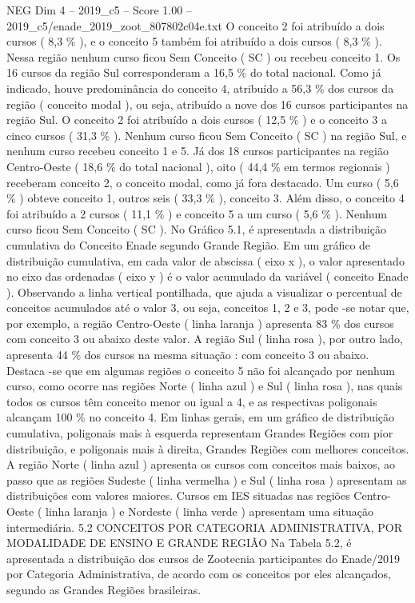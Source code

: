 \begin{textsample}{NEG Dim 4 – 2019\_c5 – Score 1.00 – 2019\_c5/enade\_2019\_zoot\_807802c04e.txt}
O conceito 2 foi atribuído a dois cursos ( 8,3 \% ), e o conceito 5 também foi atribuído a dois cursos ( 8,3 \% ).
Nessa região nenhum curso ficou Sem Conceito ( SC ) ou recebeu conceito 1.
Os 16 cursos da região Sul corresponderam a 16,5 \% do total nacional.
Como já indicado, houve predominância do conceito 4, atribuído a 56,3 \% dos cursos da região ( conceito modal ), ou seja, atribuído a nove dos 16 cursos participantes na região Sul.
O conceito 2 foi atribuído a dois cursos ( 12,5 \% ) e o conceito 3 a cinco cursos ( 31,3 \% ).
Nenhum curso ficou Sem Conceito ( SC ) na região Sul, e nenhum curso recebeu conceito 1 e 5.
Já dos 18 cursos participantes na região Centro-Oeste ( 18,6 \% do total nacional ), oito ( 44,4 \% em termos regionais ) receberam conceito 2, o conceito modal, como já fora destacado.
Um curso ( 5,6 \% ) obteve conceito 1, outros seis ( 33,3 \% ), conceito 3.
Além disso, o conceito 4 foi atribuído a 2 cursos ( 11,1 \% ) e conceito 5 a um curso ( 5,6 \% ).
Nenhum curso ficou Sem Conceito ( SC ).
No Gráfico 5.1, é apresentada a distribuição cumulativa do Conceito Enade segundo Grande Região.
Em um gráfico de distribuição cumulativa, em cada valor de abscissa ( eixo x ), o valor apresentado no eixo das ordenadas ( eixo y ) é o valor acumulado da variável ( conceito Enade ).
Observando a linha vertical pontilhada, que ajuda a visualizar o percentual de conceitos acumulados até o valor 3, ou seja, conceitos 1, 2 e 3, pode -se notar que, por exemplo, a região Centro-Oeste ( linha laranja ) apresenta 83 \% dos cursos com conceito 3 ou abaixo deste valor.
A região Sul ( linha rosa ), por outro lado, apresenta 44 \% dos cursos na mesma situação : com conceito 3 ou abaixo.
Destaca -se que em algumas regiões o conceito 5 não foi alcançado por nenhum curso, como ocorre nas regiões Norte ( linha azul ) e Sul ( linha rosa ), nas quais todos os cursos têm conceito menor ou igual a 4, e as respectivas poligonais alcançam 100 \% no conceito 4.
Em linhas gerais, em um gráfico de distribuição cumulativa, poligonais mais à esquerda representam Grandes Regiões com pior distribuição, e poligonais mais à direita, Grandes Regiões com melhores conceitos.
A região Norte ( linha azul ) apresenta os cursos com conceitos mais baixos, ao passo que as regiões Sudeste ( linha vermelha ) e Sul ( linha rosa ) apresentam as distribuições com valores maiores.
Cursos em IES situadas nas regiões Centro-Oeste ( linha laranja ) e Nordeste ( linha verde ) apresentam uma situação intermediária. 5.2 CONCEITOS POR CATEGORIA ADMINISTRATIVA, POR MODALIDADE DE ENSINO E GRANDE REGIÃO Na Tabela 5.2, é apresentada a distribuição dos cursos de Zootecnia participantes do Enade/2019 por Categoria Administrativa, de acordo com os conceitos por eles alcançados, segundo as Grandes Regiões brasileiras.

\end{textsample}
